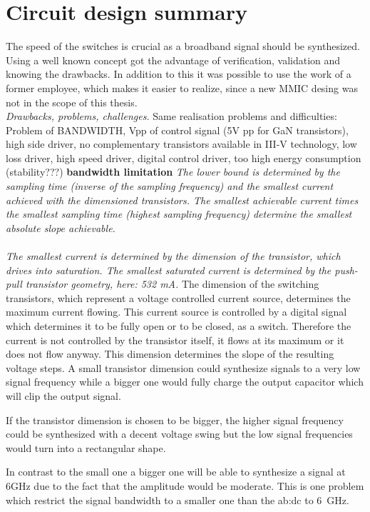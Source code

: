\section{Circuit design summary}
The speed of the switches is crucial as a broadband signal should be synthesized.
Using a well known concept got the advantage of verification, validation and knowing the drawbacks.
In addition to this it was possible to use the work of a former employee, which makes it easier to realize, since a new MMIC desing was not in the scope of this thesis.\\
\textit{Drawbacks, problems, challenges.}
Same realisation problems and difficulties: Problem of BANDWIDTH, Vpp of control signal (5V pp for GaN transistors), high side driver, no complementary transistors available in III-V technology, low loss driver, high speed driver, digital control driver, too high energy consumption (stability???)
\textbf{bandwidth limitation}
\textit{The lower bound is determined by the sampling time (inverse of the sampling frequency) and the smallest current achieved with the dimensioned transistors.
 The smallest achievable current times the smallest sampling time (highest sampling frequency) determine the smallest absolute slope achievable. \\
\\
The smallest current is determined by the dimension of the transistor, which drives into saturation. 
The smallest saturated current is determined by the push-pull transistor geometry, here: 532 mA.}
The dimension of the switching transistors, which represent a voltage controlled current source, determines the maximum current flowing.
This current source is controlled by a digital signal which determines it to be fully open or to be closed, as a switch.
Therefore the current is not controlled by the transistor itself, it flows at its maximum or it does not flow anyway.
This dimension determines the slope of the resulting voltage steps.
A small transistor dimension could synthesize signals to a very low signal frequency while a bigger one would fully charge the output capacitor which will clip the output signal.

If the transistor dimension is chosen to be bigger, the higher signal frequency could be synthesized with a decent voltage swing but the low signal frequencies would turn into a rectangular shape. 

In contrast to the small one a bigger one will be able to synthesize a signal at 6GHz due to the fact that the amplitude would be moderate.
This is one problem which restrict the signal bandwidth to a smaller one than the \gls{ab:dc} to \SI{6}{\GHz}.